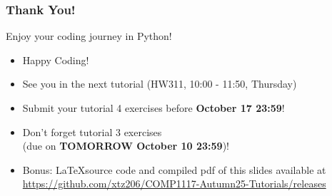 \documentclass{beamer}
\begin{document}
\begin{frame}
    \frametitle{Thank You!}

    Enjoy your coding journey in Python!

    \begin{itemize}
        \item Happy Coding!
        \item See you in the next tutorial (HW311, 10:00 - 11:50, Thursday)
        \item Submit your tutorial 4 exercises before \textbf{October 17 23:59}!
        \item Don't forget tutorial 3 exercises\\
              (due on \textbf{TOMORROW October 10 23:59})!
        \item Bonus: \LaTeX source code and compiled pdf of this slides available at
              \href{https://github.com/xtz206/COMP1117-Autumn25-Tutorials/releases}
              {https://github.com/xtz206/COMP1117-Autumn25-Tutorials/releases}
    \end{itemize}
\end{frame}
\end{document}
